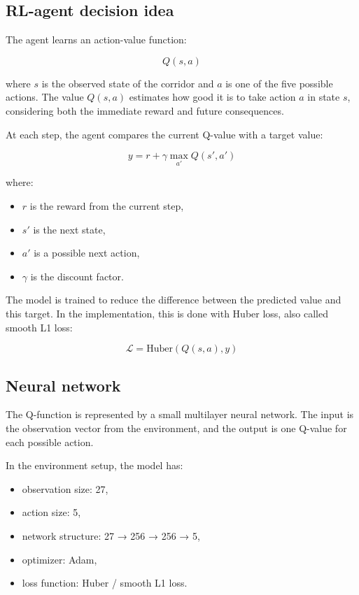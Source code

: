 \documentclass[11pt]{article}
\providecommand{\tightlist}{%
      \setlength{\itemsep}{0pt}\setlength{\parskip}{0pt}}
\begin{document}
\subsection{RL-agent decision idea}\label{rl-agent-decision-idea}

The agent learns an action-value function:

\[
Q(s,a)
\]

where \(s\) is the observed state of the corridor and \(a\) is one of
the five possible actions. The value \(Q(s,a)\) estimates how good it is
to take action \(a\) in state \(s\), considering both the immediate
reward and future consequences.

At each step, the agent compares the current Q-value with a target
value:

\[
y = r + \gamma \max_{a'} Q(s', a')
\]

where:

\begin{itemize}
\tightlist
\item
  \(r\) is the reward from the current step,
\item
  \(s'\) is the next state,
\item
  \(a'\) is a possible next action,
\item
  \(\gamma\) is the discount factor.
\end{itemize}

The model is trained to reduce the difference between the predicted
value and this target. In the implementation, this is done with Huber
loss, also called smooth L1 loss:

\[
\mathcal{L} = \mathrm{Huber}\left(Q(s,a), y\right)
\]

\subsection{Neural network}\label{neural-network}

The Q-function is represented by a small multilayer neural network. The
input is the observation vector from the environment, and the output is
one Q-value for each possible action.

In the environment setup, the model has:

\begin{itemize}
\tightlist
\item
  observation size: 27,
\item
  action size: 5,
\item
  network structure: 27 → 256 → 256 → 5,
\item
  optimizer: Adam,
\item
  loss function: Huber / smooth L1 loss.
\end{itemize}
\end{document}
